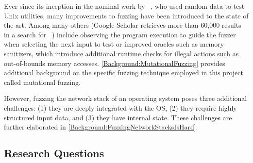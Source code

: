 \documentclass[twocolumn]{article}
\let\savedCite=\cite
\renewcommand{\cite}{\unskip~\savedCite}
\begin{document}
Ever since its inception in the nominal work by \citeauthor{UNIX}\cite{UNIX}, who used random data to test Unix utilities, many improvements to fuzzing have been introduced to the state of the art. Among many others (Google Scholar retrieves more than 60,000 results in a search for \cite{GoogleScholarFuzzing}) include observing the program execution to guide the fuzzer when selecting the next input to test or improved oracles such as memory sanitizers, which introduce additional runtime checks for illegal actions such as out-of-bounds memory accesses. \cref{Background:MutationalFuzzing} provides additional background on the specific fuzzing technique employed in this project called mutational fuzzing.

However, fuzzing the network stack of an operating system poses three additional challenges: (1) they are deeply integrated with the OS, (2) they require highly structured input data, and (3) they have internal state. These challenges are further elaborated in \cref{Background:FuzzingNetworkStacksIsHard}.

\subsection{Research Questions}
\label{Introduction:ResearchQuestions}
\end{document}
